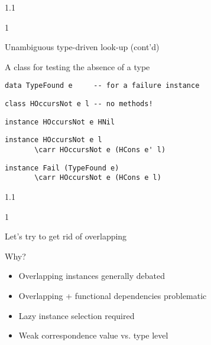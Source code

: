 \documentclass{slides}
\newenvironment{myslide}{\begin{slide}\color{Blue}\begin{boxedminipage}{1.1\hsize}\begin{boxedminipage}{1\hsize}\color{Black}
\vspace{-170\in}
}{%
\smallskip
\end{boxedminipage}
\end{boxedminipage}
\end{slide}}
\newenvironment{myslide}{\begin{slide}
}{%
\end{slide}}
\newenvironment{myslide}{\begin{slide}\color{White}\begin{boxedminipage}{1.1\hsize}\color{Black}
\vspace{-170\in}
}{%
\smallskip
\end{boxedminipage}
\end{slide}}
\newcommand{\header}[1]{{\large \color{Red} #1}}
\newcommand{\blau}[1]{{\vspace{-50\in}\normalsize \color{Blue} #1}}
\newcommand{\carr}{\ensuremath{\Rightarrow}}
\begin{document}
\begin{myslide}

\header{Unambiguous type-driven look-up (cont'd)}

\vspace{-77\in}

\blau{A class for testing the absence of a type}

\bigskip

\begin{Verbatim}[fontfamily=courier,fontsize=\small,commandchars=\\\{\}]
 data TypeFound e     -- for a failure instance
\end{Verbatim}

\medskip

\begin{Verbatim}[fontfamily=courier,fontsize=\small,commandchars=\\\{\}]
 class HOccursNot e l -- no methods!
\end{Verbatim}

\medskip

\begin{Verbatim}[fontfamily=courier,fontsize=\small,commandchars=\\\{\}]
 instance HOccursNot e HNil
\end{Verbatim}

\medskip

\begin{Verbatim}[fontfamily=courier,fontsize=\small,commandchars=\\\{\}]
 instance HOccursNot e l
       \carr HOccursNot e (HCons e' l)
\end{Verbatim}

\medskip

\begin{Verbatim}[fontfamily=courier,fontsize=\small,commandchars=\\\{\}]
 instance Fail (TypeFound e)
       \carr HOccursNot e (HCons e l)
\end{Verbatim}

\end{myslide}







\begin{myslide}

\header{Let's try to get rid of overlapping}

\blau{Why?}

\medskip

\begin{itemize}
\item Overlapping instances generally debated
\item Overlapping + functional dependencies problematic
\item Lazy instance selection required
\item Weak correspondence value vs. type level
\end{itemize}

\end{myslide}
\end{document}
